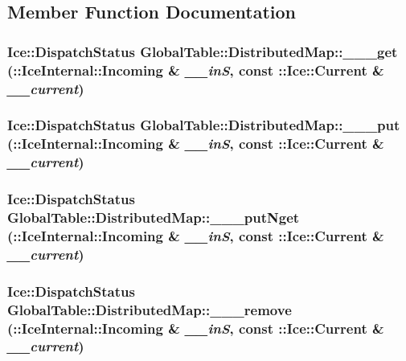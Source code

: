 \subsection{Member Function Documentation}
\hypertarget{class_global_table_1_1_distributed_map_a5a40a86ee15c5e514ad11d40f9d2d933}{
\subsubsection[{\_\-\_\-\_\-get}]{\setlength{\rightskip}{0pt plus 5cm}Ice::DispatchStatus GlobalTable::DistributedMap::\_\-\_\-\_\-get (::IceInternal::Incoming \& {\em \_\-\_\-inS}, \/  const ::Ice::Current \& {\em \_\-\_\-current})}}
\label{class_global_table_1_1_distributed_map_a5a40a86ee15c5e514ad11d40f9d2d933}
\hypertarget{class_global_table_1_1_distributed_map_af3512ae03f3c215d69d52f46b6341385}{
\subsubsection[{\_\-\_\-\_\-put}]{\setlength{\rightskip}{0pt plus 5cm}Ice::DispatchStatus GlobalTable::DistributedMap::\_\-\_\-\_\-put (::IceInternal::Incoming \& {\em \_\-\_\-inS}, \/  const ::Ice::Current \& {\em \_\-\_\-current})}}
\label{class_global_table_1_1_distributed_map_af3512ae03f3c215d69d52f46b6341385}
\hypertarget{class_global_table_1_1_distributed_map_af93cc87ef0ac309db7d414c033db31e6}{
\subsubsection[{\_\-\_\-\_\-putNget}]{\setlength{\rightskip}{0pt plus 5cm}Ice::DispatchStatus GlobalTable::DistributedMap::\_\-\_\-\_\-putNget (::IceInternal::Incoming \& {\em \_\-\_\-inS}, \/  const ::Ice::Current \& {\em \_\-\_\-current})}}
\label{class_global_table_1_1_distributed_map_af93cc87ef0ac309db7d414c033db31e6}
\hypertarget{class_global_table_1_1_distributed_map_ad4122b38aa7a4fd717eb67c0bb94e209}{
\subsubsection[{\_\-\_\-\_\-remove}]{\setlength{\rightskip}{0pt plus 5cm}Ice::DispatchStatus GlobalTable::DistributedMap::\_\-\_\-\_\-remove (::IceInternal::Incoming \& {\em \_\-\_\-inS}, \/  const ::Ice::Current \& {\em \_\-\_\-current})}}
